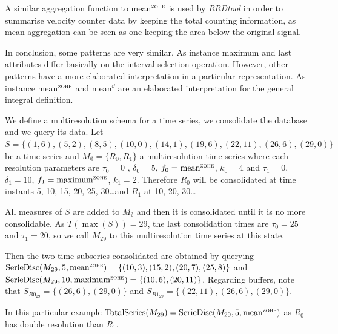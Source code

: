 A similar aggregation function to mean$^\zohe{}$ is used by \emph{RRDtool}
\cite{rrdtool} in order to summarise velocity coun\-ter
data by keeping the total counting information, as mean aggregation
can be seen as one keeping the area below the original signal.


In conclusion, some patterns are very similar. As instance maximum and
last attributes differ basically on the interval selection
operation. However, other patterns have a more elaborated
interpretation in a particular representation. As instance
mean$^\zohe{}$ and mean$^\dd$ are an elaborated interpretation for
the general integral definition.





\begin{example}\label{ex:model:smultiresolution} 
  We define a multiresolution schema for a time series, we consolidate
  the database and we query its data.  Let $S = \{
  (1,6),(5,2),\allowbreak (8,5),\allowbreak (10,0),\allowbreak
  (14,1),\allowbreak (19,6),\allowbreak (22,11),\allowbreak
  (26,6),(29,0) \}$ be a time series and $M_\emptyset=\{R_0,R_1\}$ a
  multiresolution time series where each resolution parameters are
  $\tau_0=0$ , $\delta_0=5$, $f_0 =\meanz$, $k_0=4$ and $\tau_1=0$,
  $\delta_1=10$, $f_1 =\maxz$, $k_1=2$. Therefore $R_0$ will be
  consolidated at time instants 5, 10, 15, 20, 25, 30\dots and $R_1$
  at 10, 20, 30\dots

  All measures of $S$ are added to $M_\emptyset$
  and then it is consolidated until it is no more consolidable. As
  $T(\max(S))=29$, the last consolidation times are $\tau_0=25$ and
  $\tau_1=20$, so we call $M_{29}$ to this multiresolution time series
  at this state.

  Then the two time subseries consolidated are obtained by querying
  $\seriedisc(M_{29},5,\allowbreak \meanz)=\{(10,3),\allowbreak
  (15,\allowbreak 2),\allowbreak (20,7),\allowbreak (25,8)\}$ and
  $\seriedisc(M_{29},10,\allowbreak  \maxz) =\allowbreak \{ \allowbreak
  (10,6),\allowbreak (20,11)\}$. Regarding buffers, note that
  $S_{B0_{29}}= \{\allowbreak (26,6),\allowbreak (29,0)\allowbreak \}$
  and $S_{B1_{29}}=\{\allowbreak (22,11),\allowbreak (26,6),(29,0)\}$.

  In this particular example
  $ \totalseries(M_{29}) = \seriedisc(M_{29},\allowbreak 5,\meanz)$ as $R_0$ has
  double resolution than $R_1$. 
\end{example}






